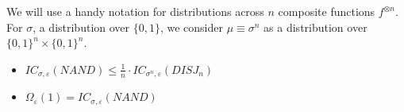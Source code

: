 We will use a handy notation for distributions across $n$ composite functions $f^{\otimes n}$. For $\sigma$, a distribution over $\{0, 1\}$, we consider $\mu \equiv \sigma^n$ as a distribution over $\{0, 1\}^n \times \{0, 1\}^n$. 

\begin{proposition}
	\begin{itemize}
		\item $IC_{\sigma, \varepsilon} (NAND) \leq \frac{1}{n} \cdot IC_{\sigma^n, \varepsilon} (DISJ_n)$ 
		\item $\Omega_{\varepsilon} (1) = IC_{\sigma, \varepsilon} (NAND)$
	\end{itemize}
\end{proposition}















